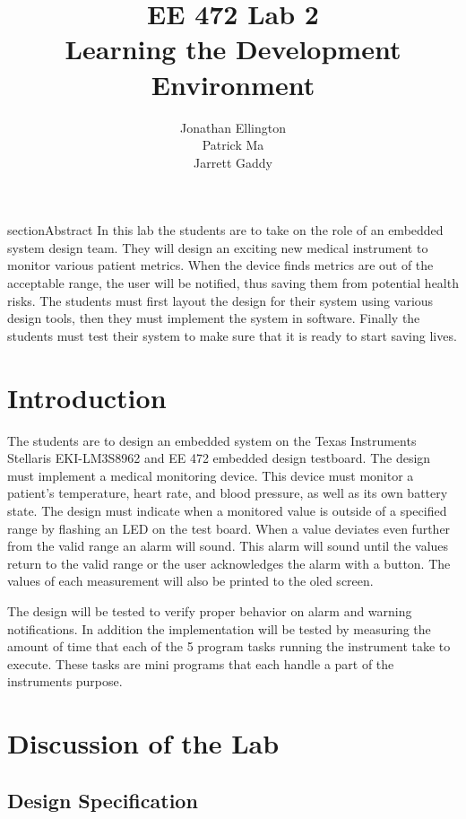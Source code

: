 \documentclass[12pt]{article} %
\title{\TitleFont EE 472 Lab 2 \\ Learning the Development Environment \vfill }
\author{\AuthorFont Jonathan Ellington \\ Patrick Ma \\ Jarrett Gaddy}
\date{}
\begin{document}
\maketitle
\thispagestyle{empty}
\pagebreak
\tableofcontents
\listoftables
\listoffigures
\thispagestyle{empty}
\pagebreak
\setcounter{page}{1}


section{Abstract} In this lab the students are to take on the role of an
embedded system design team. They will design an exciting new medical
instrument to monitor various patient metrics. When the device finds metrics
are out of the acceptable range, the user will be notified, thus saving them
from potential health risks. The students must first layout the design for
their system using various design tools, then they must implement the system in
software. Finally the students must test their system to make sure that it is
ready to start saving lives. 

\section{Introduction}
The students are to design an embedded system on the Texas Instruments
Stellaris EKI-LM3S8962 and EE 472 embedded design testboard. The design must
implement a medical monitoring device. This device must monitor a patient's
temperature, heart rate, and blood pressure, as well as its own battery state.
The design must indicate when a monitored value is outside of a specified range
by flashing an LED on the test board. When a value deviates even further from
the valid range an alarm will sound. This alarm will sound until the values
return to the valid range or the user acknowledges the alarm with a button. The
values of each measurement will also be printed to the oled screen.

The design will be tested to verify proper behavior on alarm and warning notifications. In addition the implementation will be tested by measuring the amount of time that each of the 5 program tasks running the instrument take to execute. These tasks are mini programs that each handle a part of the instruments purpose.
\section{Discussion of the Lab}

\subsection{Design Specification\label{sec:designSpec}} 
\end{document}
